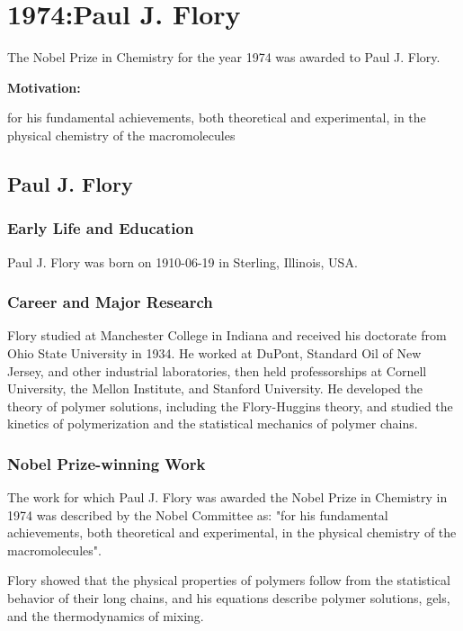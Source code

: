\chapter{1974:Paul J. Flory}

\label{chap:chemistry1974}

The Nobel Prize in Chemistry for the year 1974 was awarded to Paul J. Flory.

\textbf{Motivation:}

for his fundamental achievements, both theoretical and experimental, in the physical chemistry of the macromolecules

\section{Paul J. Flory}

\subsection*{Early Life and Education}

Paul J. Flory was born on 1910-06-19 in Sterling, Illinois, USA.

\subsection*{Career and Major Research}

Flory studied at Manchester College in Indiana and received his doctorate from Ohio State University in 1934. He worked at DuPont, Standard Oil of New Jersey, and other industrial laboratories, then held professorships at Cornell University, the Mellon Institute, and Stanford University. He developed the theory of polymer solutions, including the Flory-Huggins theory, and studied the kinetics of polymerization and the statistical mechanics of polymer chains.

\subsection*{Nobel Prize-winning Work}

The work for which Paul J. Flory was awarded the Nobel Prize in Chemistry in 1974 was described by the Nobel Committee as: "for his fundamental achievements, both theoretical and experimental, in the physical chemistry of the macromolecules".

Flory showed that the physical properties of polymers follow from the statistical behavior of their long chains, and his equations describe polymer solutions, gels, and the thermodynamics of mixing.

